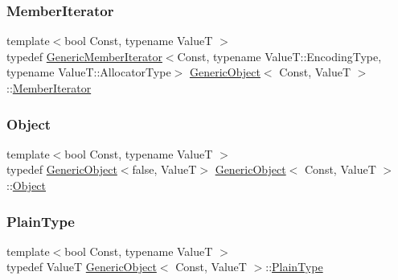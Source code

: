 \mbox{\label{classGenericObject_a1f531d70f8d57ed30199ac445b5935e6}} 
\subsubsection{\texorpdfstring{Member\+Iterator}{MemberIterator}}
{\footnotesize\ttfamily template$<$bool Const, typename ValueT $>$ \\
typedef \hyperlink{classGenericMemberIterator}{Generic\+Member\+Iterator}$<$Const, typename Value\+T\+::\+Encoding\+Type, typename Value\+T\+::\+Allocator\+Type$>$ \hyperlink{classGenericObject}{Generic\+Object}$<$ Const, ValueT $>$\+::\hyperlink{classGenericObject_a1f531d70f8d57ed30199ac445b5935e6}{Member\+Iterator}}

\mbox{\label{classGenericObject_ae8f5673d0cf8e7ebfd2d4f6ab27b632d}} 
\subsubsection{\texorpdfstring{Object}{Object}}
{\footnotesize\ttfamily template$<$bool Const, typename ValueT $>$ \\
typedef \hyperlink{classGenericObject}{Generic\+Object}$<$false, ValueT$>$ \hyperlink{classGenericObject}{Generic\+Object}$<$ Const, ValueT $>$\+::\hyperlink{classGenericObject_ae8f5673d0cf8e7ebfd2d4f6ab27b632d}{Object}}

\mbox{\label{classGenericObject_a4c25f4a5f696745c418b91ad9f577f12}} 
\subsubsection{\texorpdfstring{Plain\+Type}{PlainType}}
{\footnotesize\ttfamily template$<$bool Const, typename ValueT $>$ \\
typedef ValueT \hyperlink{classGenericObject}{Generic\+Object}$<$ Const, ValueT $>$\+::\hyperlink{classGenericObject_a4c25f4a5f696745c418b91ad9f577f12}{Plain\+Type}}

